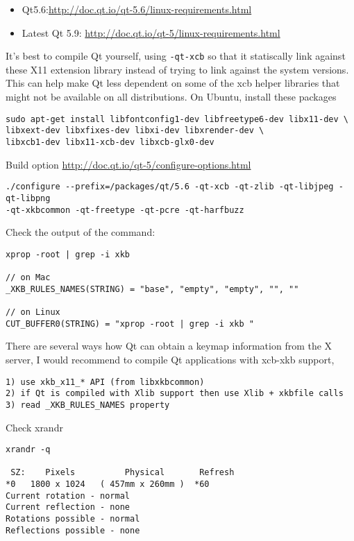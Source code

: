 \begin{itemize}
  \item  Qt5.6:\url{http://doc.qt.io/qt-5.6/linux-requirements.html}

  \item Latest Qt 5.9: \url{http://doc.qt.io/qt-5/linux-requirements.html}
\end{itemize}

It's best to compile Qt yourself, using \verb!-qt-xcb! so that it statiscally
link against these X11 extension library instead of trying to link against
the system versions.  This can help make Qt less dependent on some of the xcb
helper libraries that might not be available on all distributions. On Ubuntu,
install these packages
\begin{verbatim}
sudo apt-get install libfontconfig1-dev libfreetype6-dev libx11-dev \
libxext-dev libxfixes-dev libxi-dev libxrender-dev \
libxcb1-dev libx11-xcb-dev libxcb-glx0-dev
\end{verbatim}
Build option \url{http://doc.qt.io/qt-5/configure-options.html}
\begin{verbatim}
./configure --prefix=/packages/qt/5.6 -qt-xcb -qt-zlib -qt-libjpeg -qt-libpng
-qt-xkbcommon -qt-freetype -qt-pcre -qt-harfbuzz
\end{verbatim}


Check the output of the command:
\begin{verbatim}
xprop -root | grep -i xkb

// on Mac
_XKB_RULES_NAMES(STRING) = "base", "empty", "empty", "", ""

// on Linux
CUT_BUFFER0(STRING) = "xprop -root | grep -i xkb "
\end{verbatim}

There are several ways how Qt can obtain a keymap information from the X server,
I would recommend to compile Qt applications with xcb-xkb support,
\begin{verbatim}
1) use xkb_x11_* API (from libxkbcommon)
2) if Qt is compiled with Xlib support then use Xlib + xkbfile calls
3) read _XKB_RULES_NAMES property
\end{verbatim}

Check xrandr
\begin{verbatim}
xrandr -q

 SZ:    Pixels          Physical       Refresh
*0   1800 x 1024   ( 457mm x 260mm )  *60  
Current rotation - normal
Current reflection - none
Rotations possible - normal 
Reflections possible - none
\end{verbatim}

